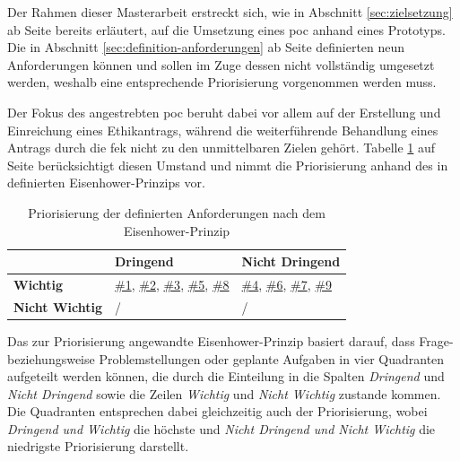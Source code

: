 \documentclass[a4paper,12pt,twoside,numbers=noendperiod]{scrreprt}
\begin{document}
Der Rahmen dieser Masterarbeit erstreckt sich, wie in Abschnitt \ref{sec:zielsetzung} ab Seite \pageref{sec:zielsetzung} bereits erläutert, auf die Umsetzung eines \ac{poc} anhand eines Prototyps. Die in Abschnitt \ref{sec:definition-anforderungen} ab Seite \pageref{sec:definition-anforderungen} definierten neun Anforderungen können und sollen im Zuge dessen nicht vollständig umgesetzt werden, weshalb eine entsprechende Priorisierung vorgenommen werden muss.

\medskip

Der Fokus des angestrebten \ac{poc} beruht dabei vor allem auf der Erstellung und Einreichung eines Ethikantrags, während die weiterführende Behandlung eines Antrags durch die \ac{fek} nicht zu den unmittelbaren Zielen gehört. Tabelle \ref{tab:priorisierung-anforderungen} auf Seite \pageref{tab:priorisierung-anforderungen} berücksichtigt diesen Umstand und nimmt die Priorisierung anhand des in \cite{chai_what_2020} definierten Eisenhower-Prinzips vor.

\begin{table}[ht!]
    \centering
    \begin{tabular}{p{.15\linewidth} | p{.35\linewidth} | p{.35\linewidth}}
        & \textbf{Dringend} & \textbf{Nicht Dringend} \\
        \hline
        \textbf{Wichtig} & \hyperref[sub-sub-sec:abgeleitete-anforderungen-vorfeld-antrag]{\#1}, \hyperref[sub-sub-sec:abgeleitete-anforderungen-während-erstellung-einreichung]{\#2}, \hyperref[sub-sub-sec:abgeleitete-anforderungen-während-erstellung-einreichung]{\#3}, \hyperref[sub-sub-sec:abgeleitete-anforderungen-während-erstellung-einreichung]{\#5}, \hyperref[sub-sub-sec:abgeleitete-anforderungen-nach-einreichung]{\#8} & \hyperref[sub-sub-sec:abgeleitete-anforderungen-während-erstellung-einreichung]{\#4}, \hyperref[sub-sub-sec:abgeleitete-anforderungen-während-erstellung-einreichung]{\#6}, \hyperref[sub-sub-sec:abgeleitete-anforderungen-nach-einreichung]{\#7}, \hyperref[sub-sub-sec:abgeleitete-anforderungen-nach-einreichung]{\#9} \\
        \hline
        \textbf{Nicht Wichtig} & / & /
    \end{tabular}
    \caption{Priorisierung der definierten Anforderungen nach dem Eisenhower-Prinzip}
    \label{tab:priorisierung-anforderungen}
\end{table}

Das zur Priorisierung angewandte Eisenhower-Prinzip basiert darauf, dass Frage- beziehungsweise Problemstellungen oder geplante Aufgaben in vier Quadranten aufgeteilt werden können, die durch die Einteilung in die Spalten \textit{Dringend} und \textit{Nicht Dringend} sowie die Zeilen \textit{Wichtig} und \textit{Nicht Wichtig} zustande kommen. Die Quadranten entsprechen dabei gleichzeitig auch der Priorisierung, wobei \textit{Dringend und Wichtig} die höchste und \textit{Nicht Dringend und Nicht Wichtig} die niedrigste Priorisierung darstellt. \cite{chai_what_2020}
\end{document}
